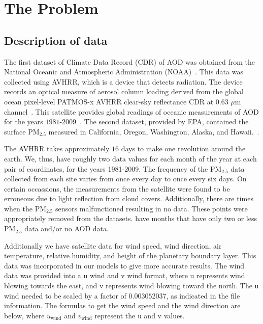 \documentclass[10pt]{article}
\begin{document}
\section{The Problem}





\subsection{Description of data}

The first dataset of Climate Data Record (CDR) of AOD was obtained from the
National Oceanic and Atmospheric Administration (NOAA)~\cite{noaa}. 
This data was collected using AVHRR, which is a device that 
detects radiation. The device records 
an optical measure of aerosol column loading derived from the global ocean
pixel-level PATMOS-x AVHRR clear-sky reflectance CDR at $0.63$ $\mu$m
channel~\cite{noaa}. 
This satellite provides global readings of oceanic measurements of AOD for the
years $1981$-$2009$~\cite{noaa}. 
The second dataset, provided by EPA,
contained the surface PM$_{2.5}$ measured in California, Oregon, Washington,
Alaska, and Hawaii.~\cite{epa}.

The AVHRR takes approximately $16$ days to make one revolution around the
earth. We, thus, have roughly two data values for each month of the year at
each pair of coordinates, for the years 1981-2009. The frequency of the
PM$_{2.5}$ data collected from each site varies from once every day to once
every six days. On certain occassions, the measurements from the satellite were
found to be  erroneous due to light reflection from cloud covers. Additionally,
there are times when the PM$_{2.5}$ sensors malfunctioned resulting in no data.
These points were appropriately removed from the datasets. %
have months that have only two or less PM$_{2.5}$ data and/or no AOD data. 

Additionally we have satellite data for wind speed, wind direction, air
temperature, relative humidity, and  height of the planetary boundary layer.
This data was incorporated in our models to give more accurate results. The
wind data was provided into a u wind and v wind format, where u represents wind
blowing towards the east, and v represents wind blowing toward the north. The u
wind needed to be scaled by a factor of $0.003052037$, as indicated in the file
information. The formulas to get the wind speed and the wind direction are
below, where $u_\text{wind}$ and $v_\text{wind}$ represent the u and v values.
\cite{wind}
\end{document}
